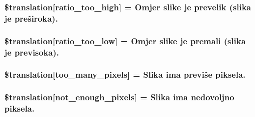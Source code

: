\subsubsection[{\$translation}]{\setlength{\rightskip}{0pt plus 5cm}\$translation\mbox{[}\textquotesingle{}ratio\+\_\+too\+\_\+high\textquotesingle{}\mbox{]} = \textquotesingle{}Omjer slike je prevelik (slika je preširoka).\textquotesingle{}}\label{class_8upload_8hr___h_r_8php_a23396f6ce7f31e5e5f1b57580621d982}
\hypertarget{class_8upload_8hr___h_r_8php_ac533b9a479f056b0b8623e4268f068c2}{}
\subsubsection[{\$translation}]{\setlength{\rightskip}{0pt plus 5cm}\$translation\mbox{[}\textquotesingle{}ratio\+\_\+too\+\_\+low\textquotesingle{}\mbox{]} = \textquotesingle{}Omjer slike je premali (slika je previsoka).\textquotesingle{}}\label{class_8upload_8hr___h_r_8php_ac533b9a479f056b0b8623e4268f068c2}
\hypertarget{class_8upload_8hr___h_r_8php_aa4051ef64e94a3f8295c63cf85544016}{}
\subsubsection[{\$translation}]{\setlength{\rightskip}{0pt plus 5cm}\$translation\mbox{[}\textquotesingle{}too\+\_\+many\+\_\+pixels\textquotesingle{}\mbox{]} = \textquotesingle{}Slika ima previše piksela.\textquotesingle{}}\label{class_8upload_8hr___h_r_8php_aa4051ef64e94a3f8295c63cf85544016}
\hypertarget{class_8upload_8hr___h_r_8php_a1fe342c27ce61f4ff4e0120ba647033e}{}
\subsubsection[{\$translation}]{\setlength{\rightskip}{0pt plus 5cm}\$translation\mbox{[}\textquotesingle{}not\+\_\+enough\+\_\+pixels\textquotesingle{}\mbox{]} = \textquotesingle{}Slika ima nedovoljno piksela.\textquotesingle{}}\label{class_8upload_8hr___h_r_8php_a1fe342c27ce61f4ff4e0120ba647033e}
\hypertarget{class_8upload_8hr___h_r_8php_a4ce76e7be0b3a03c2b47f6d70c21832e}{}

